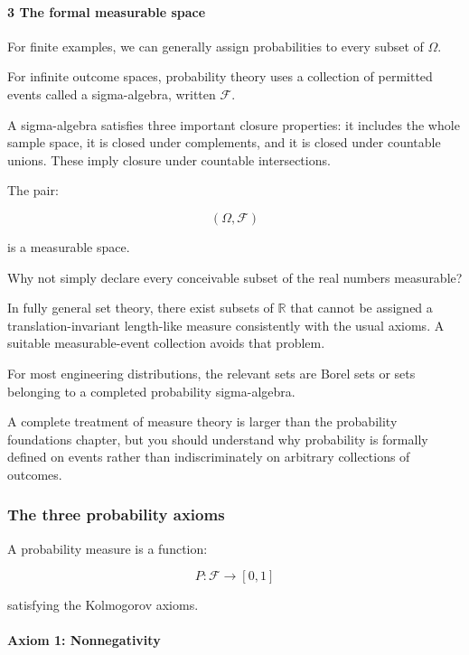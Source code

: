 \paragraph{3 The formal measurable space}\label{the-formal-measurable-space}

For finite examples, we can generally assign probabilities to every subset of \(\Omega\).

For infinite outcome spaces, probability theory uses a collection of permitted events called a sigma-algebra, written \(\mathcal F\).

A sigma-algebra satisfies three important closure properties: it includes the whole sample space, it is closed under complements, and it is closed under countable unions. These imply closure under countable intersections.

The pair:

\[
 (\Omega,\mathcal F)
\]

is a measurable space.

Why not simply declare every conceivable subset of the real numbers measurable?

In fully general set theory, there exist subsets of \(\mathbb R\) that cannot be assigned a translation-invariant length-like measure consistently with the usual axioms. A suitable measurable-event collection avoids that problem.

For most engineering distributions, the relevant sets are Borel sets or sets belonging to a completed probability sigma-algebra.

A complete treatment of measure theory is larger than the probability foundations chapter, but you should understand why probability is formally defined on events rather than indiscriminately on arbitrary collections of outcomes.

\subsubsection{The three probability axioms}\label{the-three-probability-axioms}

A probability measure is a function:

\[
 P:\mathcal F\rightarrow[0,1]
\]

satisfying the Kolmogorov axioms.

\paragraph{Axiom 1: Nonnegativity}\label{axiom-1-nonnegativity}

